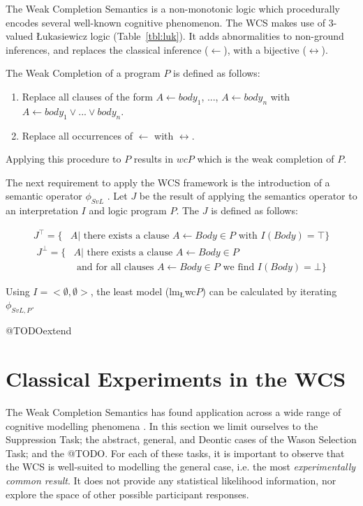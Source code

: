 \documentclass{article}
\begin{document}
The Weak Completion Semantics is a non-monotonic logic which procedurally encodes several well-known cognitive phenomenon. The WCS makes use of 3-valued \L ukasiewicz logic (Table~\ref{tbl:luk}). It adds abnormalities to non-ground inferences, and replaces the classical inference ($\leftarrow$), with a bijective ($\leftrightarrow$). 

The Weak Completion of a program $P$ is defined as follows:

\begin{enumerate}
\item Replace all clauses of the form $A \leftarrow body_1$, ..., $A \leftarrow body_n$ with $A \leftarrow body_1 \lor ... \lor body_n$.
\item Replace all occurrences of $\leftarrow$ with $\leftrightarrow$.
\end{enumerate}

Applying this procedure to $P$ results in $wcP$ which is the weak completion of $P$.

The next requirement to apply the WCS framework is the introduction of a semantic operator $\phi_{SvL}$ \citep{stenning2008interpretation}. Let $J$ be the result of applying the semantics operator to an interpretation $I$ and logic program $P$. The $J$ is defined as follows:

\[
\begin{split}
J^\top = \{ & A | \textrm{ there exists a clause } A\leftarrow Body \in P \textrm{ with } I(Body) = \top\}
\end{split}
\]
\[
\begin{split}
J^\bot = \{ &  A | \textrm{ there exists a clause } A \leftarrow Body \in P \\
           & \textrm{ and for all clauses } A \leftarrow Body \in P \textrm{ we find } I(Body) = \bot\}
\end{split}
\]

Using $I=<\emptyset, \emptyset>$, the least model ($\textrm{lm}_\textrm{\L}$wc$P$) can be calculated by iterating $\phi_{SvL,P}$.

@TODOextend



\section{Classical Experiments in the WCS} \label{sec:ecp}
The Weak Completion Semantics has found application across a wide range of cognitive modelling phenomena \citep{ragni2017formal}. In this section we limit ourselves to the Suppression Task; the abstract, general, and Deontic cases of the Wason Selection Task; and the @TODO. For each of these tasks, it is important to observe that the WCS is well-suited to modelling the general case, i.e. the most \textit{experimentally common result}. It does not provide any statistical likelihood information, nor explore the space of other possible participant responses.
\end{document}
